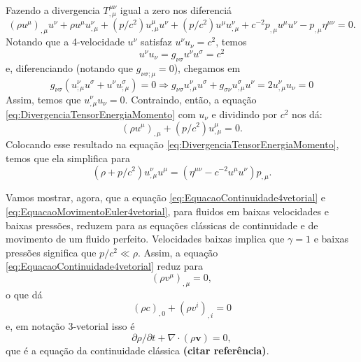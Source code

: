 Fazendo a divergencia $T^{\mu\nu}_{,\mu}$ igual a zero nos diferenciá
\begin{equation}\label{eq:DivergenciaTensorEnergiaMomento}
	\left(\rho u^{\mu}\right)_{, \mu} u^{\nu}+\rho u^{\mu} u_{, \mu}^{\nu}+\left(p / c^{2}\right) u_{, \mu}^{\mu} u^{\nu}+\left(p / c^{2}\right) u^{\mu} u_{, \mu}^{\nu}+c^{-2} p_{, \mu} u^{\mu} u^{\nu}-p_{, \mu} \eta^{\mu \nu}=0.
\end{equation}
Notando que a 4-velocidade $u^\nu$ satisfaz $u^{\nu}u_\nu=c^2$, temos
\[
	u^\nu u_\nu = g_{\nu\sigma}u^\nu u^\sigma = c^2
\]
e, diferenciando {\color{ForestGreen} (notando que $g_{\nu\sigma;\mu}=0$)}, chegamos em
\[
	g_{\nu\sigma}\left(u^{\nu}_{;\mu}u^{\sigma}+u^{\nu}u^{\sigma}_{;\mu}\right)=0 
	\Rightarrow g_{\nu\sigma}u^{\nu}_{,\mu}u^{\sigma}+g_{\sigma\nu}u^{\sigma}_{,\mu}u^{\nu}= 2u_{,\mu}^{\nu} u_{\nu} = 0
\]
Assim, temos que $u_{,\mu}^{\nu} u_{\nu} = 0$. Contraindo, então, a equação \ref{eq:DivergenciaTensorEnergiaMomento} com $u_\nu$ e dividindo por $c^2$ nos dá:
\begin{equation}\label{eq:EquacaoContinuidade4vetorial}
	\boxed{
		\left(\rho u^{\mu}\right)_{, \mu}+\left(p / c^{2}\right) u_{, \mu}^{\mu}=0.
	}
\end{equation}
Colocando esse resultado na equação \ref{eq:DivergenciaTensorEnergiaMomento}, temos que ela simplifica para
\begin{equation}\label{eq:EquacaoMovimentoEuler4vetorial}
	\boxed{
		\left(\rho+p / c^{2}\right) u_{, \mu}^{\nu} u^{\mu}=\left(\eta^{\mu \nu}-c^{-2} u^{\mu} u^{\nu}\right) p_{, \mu}	.
	}
\end{equation}

Vamos mostrar, agora, que a equação \ref{eq:EquacaoContinuidade4vetorial} e \ref{eq:EquacaoMovimentoEuler4vetorial}, para fluidos em baixas velocidades e baixas pressões, reduzem para as equações clássicas de continuidade e de movimento de um fluido perfeito. Velocidades baixas implica que $\gamma=1$ e baixas pressões significa que $p/c^2 \ll \rho$. Assim, a equação  \ref{eq:EquacaoContinuidade4vetorial}  reduz para
\[\left(\rho v^{\mu}\right)_{, \mu}=0,\]
o que dá
\[(\rho c)_{, 0}+\left(\rho v^{i}\right)_{, i}=0\]
e, em notação 3-vetorial isso é
\begin{equation}\label{eq:EquacaoContinuidadeClassica3vetorial}
	\boxed{
		\partial \rho / \partial t+\nabla \cdot(\rho \mathbf{v})=0,
	}
\end{equation}
que é a equação da continuidade clássica \textbf{(citar referência)}.

